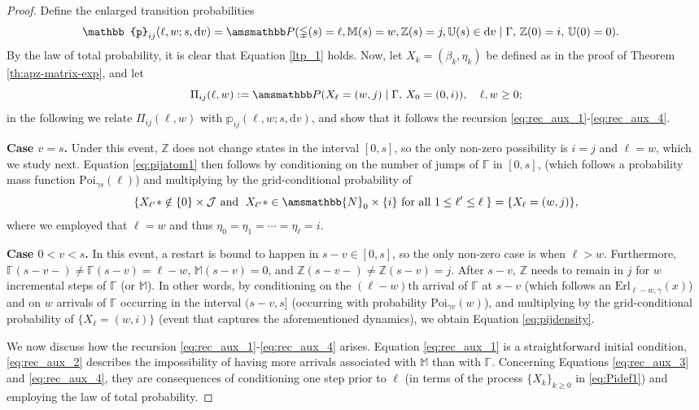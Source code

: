 \documentclass[11pt,leqno]{amsart}
\numberwithin{table}{section}
\numberwithin{figure}{section}
\numberwithin{equation}{section}
\newcommand{\dd}{\mathrm{d}}
\newcommand{\1}{{\mathds{1}}}
\newcommand{\0}{\mat{0}}
\newcommand{\N}{\amsmathbb{N}}
\renewcommand{\P }{{\amsmathbb P}}
\newcommand{\ap}[1]{\mathbb{#1}}
\begin{document}
\begin{proof}
Define the enlarged transition probabilities 
\begin{align*}\ap{p}_{ij}&(\ell, w; s, \dd v) = \P(\ap{\Gamma}(s)=\ell, \ap{M}(s)=w, \ap{Z}(s)=j, \ap{U}(s)\in\dd v \mid \Gamma,\, \ap{Z}(0)=i,\, \ap{U}(0)=0).
\end{align*}
By the law of total probability, it is clear that Equation \eqref{ltp_1} holds. Now, let $X_k=(\beta_k,\eta_k)$ be defined as in the proof of Theorem \ref{th:apz-matrix-exp}, and let
\begin{equation}\label{eq:Pidef1}\Pi_{ij}(\ell,w):=\P(X_{\ell}=(w,j)\mid \Gamma,\,X_{0}=(0,i)),\quad \ell,w\ge 0;\end{equation}
in the following we relate $\Pi_{ij}(\ell,w)$ with $\ap{p}_{ij}(\ell, w; s, \dd v)$, and show that it follows the recursion \eqref{eq:rec_aux_1}-\eqref{eq:rec_aux_4}.

\textbf{Case $v=s$.} Under this event, $\ap{Z}$ does not change states in the interval $[0,s]$, so the only non-zero possibility is $i=j$ and $\ell=w$, which we study next.
Equation \eqref{eq:pijatom1} then follows by conditioning on the number of jumps of $\ap{\Gamma}$ in $[0,s]$, (which follows a probability mass function  $\mathrm{Poi}_{\gamma s}(\ell)$) and multiplying by the grid-conditional probability of 
\[\{X_{\ell'}*\notin\{0\}\times\mathcal{J}\mbox{ and }\; X_{\ell'}*\in\N_0\times\{i\}\mbox{ for all }1\le\ell'\le \ell\;\}=\{X_{\ell}=(w,j)\},\]
where we employed that $\ell=w$ and thus $\eta_{0}=\eta_{1}=\cdots=\eta_\ell=i$.

\textbf{Case $0<v<s$.} In this event, a restart is bound to happen in $s-v\in [0,s]$, so the only non-zero case is when $\ell>w$. Furthermore, $\ap{\Gamma}(s-v-)\neq \ap{\Gamma}(s-v)=\ell-w$, $\ap{M}(s-v)=0$, and $\ap{Z}(s-v-)\neq \ap{Z}(s-v)=j$. After $s-v$, $\ap{Z}$ needs to remain in $j$ for $w$ incremental steps of $\ap{\Gamma}$ (or $\ap{M}$). In other words, by conditioning on the $(\ell-w)$th arrival of $\ap{\Gamma}$ at $s-v$ (which follows an $\mathrm{Erl}_{\ell-w,\gamma}(x)$) and on $w$ arrivals of $\ap{\Gamma}$ occurring in the interval $(s-v, s]$ (occurring with probability $\mathrm{Poi}_{\gamma v} (w)$), and multiplying by the grid-conditional probability of $\{X_{\ell}=(w,i)\}$ (event that captures the aforementioned dynamics), we obtain Equation \eqref{eq:pijdensity}.

We now discuss how the recursion \eqref{eq:rec_aux_1}-\eqref{eq:rec_aux_4} arises. Equation \eqref{eq:rec_aux_1} is a straightforward initial condition, \eqref{eq:rec_aux_2} describes the impossibility of having more arrivals associated with $\ap{M}$ than with $\ap{\Gamma}$. Concerning Equations \eqref{eq:rec_aux_3} and \eqref{eq:rec_aux_4}, they are consequences of conditioning one step prior to $\ell$ (in terms of the process $\{X_k\}_{k\ge 0}$ in \eqref{eq:Pidef1}) and employing the law of total probability.
\end{proof}
\end{document}
